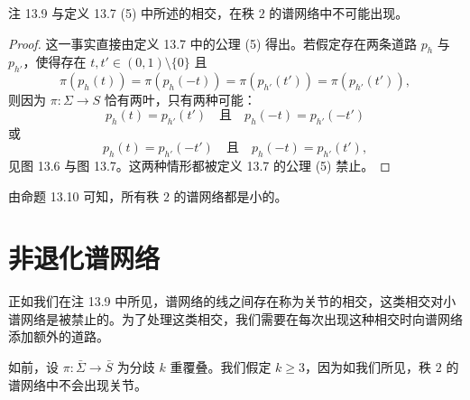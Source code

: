 
\begin{proposition}[13.10]
注 13.9 与定义 13.7 (5) 中所述的相交，在秩 $2$ 的谱网络中不可能出现。
\end{proposition}

\begin{proof}
这一事实直接由定义 13.7 中的公理 (5) 得出。若假定存在两条道路 $p_h$ 与 $p_{h'}$，使得存在 $t,t'\in(0,1)\setminus\{0\}$ 且
\[
\pi(p_h(t))=\pi(p_h(-t))=\pi(p_{h'}(t'))=\pi(p_{h'}(t')),
\]
则因为 $\pi\colon\Sigma\to S$ 恰有两叶，只有两种可能：
\[
p_h(t)=p_{h'}(t')\quad\text{且}\quad p_h(-t)=p_{h'}(-t')
\]
或
\[
p_h(t)=p_{h'}(-t')\quad\text{且}\quad p_h(-t)=p_{h'}(t'),
\]
见图 13.6 与图 13.7。这两种情形都被定义 13.7 的公理 (5) 禁止。
\end{proof}



\begin{remark}[13.11]
由命题 13.10 可知，所有秩 $2$ 的谱网络都是小的。
\end{remark}


\section{非退化谱网络}

正如我们在注 13.9 中所见，谱网络的线之间存在称为关节的相交，这类相交对小谱网络是被禁止的。为了处理这类相交，我们需要在每次出现这种相交时向谱网络添加额外的道路。

如前，设 $\pi\colon\bar\Sigma\to\bar S$ 为分歧 $k$ 重覆叠。我们假定 $k\ge3$，因为如我们所见，秩 $2$ 的谱网络中不会出现关节。

